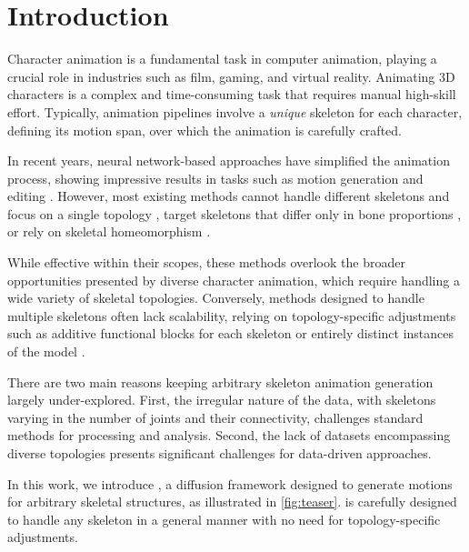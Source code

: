 \section{Introduction}\label{sec:intro}
Character animation is a fundamental task in computer animation, playing a crucial role in industries such as film, gaming, and virtual reality. 
Animating 3D characters is a complex and time-consuming task that requires manual high-skill effort. 
Typically, animation pipelines involve a \emph{unique} skeleton for each character, defining its motion span, over which the animation is carefully crafted. 

In recent years, neural network-based approaches have simplified the animation process, showing impressive results in tasks such as motion generation and editing \cite{dabral2022mofusion,tevet2023human,holden2016deep,zhang2024motiondiffuse}. However, most existing methods cannot handle different skeletons and focus on a single topology \cite{shafir2024human,kapon2023mas}, target skeletons that differ only in bone proportions \cite{tripathi2024humos, yang2023omnimotiongpt}, or rely on skeletal homeomorphism \cite{aberman2020skeleton}. 

While effective within their scopes, these methods overlook the broader opportunities presented by diverse character animation, which require handling a wide variety of skeletal topologies. Conversely, methods designed to handle multiple skeletons often lack scalability, relying on topology-specific adjustments such as additive functional blocks for each skeleton \cite{Li2024walkthedog} or entirely distinct instances of the model \cite{raab2024single, li2022ganimator}.

There are two main reasons keeping arbitrary skeleton animation generation largely under-explored. First, the irregular nature of the data, with skeletons varying in the number of joints and their connectivity, challenges standard methods for  processing and analysis. Second, the lack of datasets encompassing diverse topologies presents significant challenges for data-driven approaches.


In this work, we introduce \algoname, a diffusion framework designed to generate motions for arbitrary skeletal structures, as illustrated in \cref{fig:teaser}. \algoname is carefully designed to handle any skeleton in a general manner with no need for topology-specific adjustments. 


